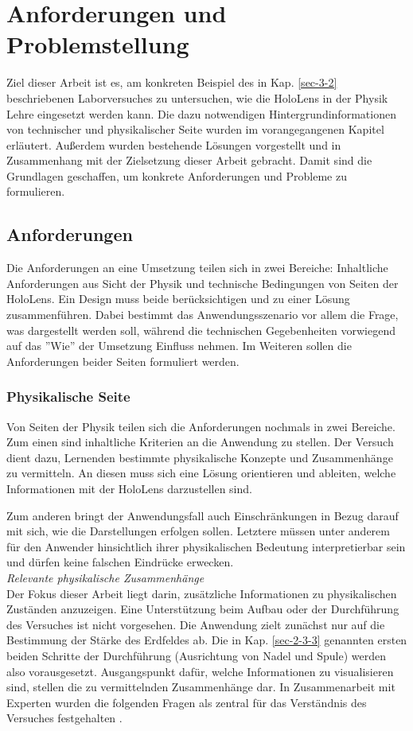 \section{Anforderungen und Problemstellung}
\label{sec-3}
Ziel dieser Arbeit ist es, am konkreten Beispiel des in Kap. \ref{sec-3-2} beschriebenen Laborversuches zu untersuchen, wie die HoloLens in der Physik Lehre eingesetzt werden kann. Die dazu notwendigen Hintergrundinformationen von technischer und physikalischer Seite wurden im vorangegangenen Kapitel erläutert. Außerdem wurden bestehende Lösungen vorgestellt und in Zusammenhang mit der Zielsetzung dieser Arbeit gebracht. Damit sind die Grundlagen geschaffen, um konkrete Anforderungen und Probleme zu formulieren.

\subsection{Anforderungen}
\label{sec-3-1}
Die Anforderungen an eine Umsetzung teilen sich in zwei Bereiche: Inhaltliche Anforderungen aus Sicht der Physik und technische Bedingungen von Seiten der HoloLens. Ein Design muss beide berücksichtigen und zu einer Lösung zusammenführen. Dabei bestimmt das Anwendungsszenario vor allem die Frage, was dargestellt werden soll, während die technischen Gegebenheiten vorwiegend auf das ''Wie'' der Umsetzung Einfluss nehmen. Im Weiteren sollen die Anforderungen beider Seiten formuliert werden.

\subsubsection{Physikalische Seite}
\label{sec-3-1-1}
Von Seiten der Physik teilen sich die Anforderungen nochmals in zwei Bereiche. Zum einen sind inhaltliche Kriterien an die Anwendung zu stellen. Der Versuch dient dazu, Lernenden bestimmte physikalische Konzepte und Zusammenhänge zu vermitteln. An diesen muss sich eine Lösung orientieren und ableiten, welche Informationen mit der HoloLens darzustellen sind.
\par
\noindent\hspace*{5mm}
Zum anderen bringt der Anwendungsfall auch Einschränkungen in Bezug darauf mit sich, wie die Darstellungen erfolgen sollen. Letztere müssen unter anderem für den Anwender hinsichtlich ihrer physikalischen Bedeutung interpretierbar sein und dürfen keine falschen Eindrücke erwecken.\\

\textit{Relevante physikalische Zusammenhänge}\\
Der Fokus dieser Arbeit liegt darin, zusätzliche Informationen zu physikalischen Zuständen anzuzeigen. Eine Unterstützung beim Aufbau oder der Durchführung des Versuches ist nicht vorgesehen. Die Anwendung zielt zunächst nur auf die Bestimmung der Stärke des Erdfeldes ab. Die in Kap. \ref{sec-2-3-3} genannten ersten beiden Schritte der Durchführung (Ausrichtung von Nadel und Spule) werden also vorausgesetzt. Ausgangspunkt dafür, welche Informationen zu visualisieren sind, stellen die zu vermittelnden Zusammenhänge dar. In Zusammenarbeit mit Experten wurden die folgenden Fragen als zentral für das Verständnis des Versuches festgehalten \autocite{Reinholz18}.

